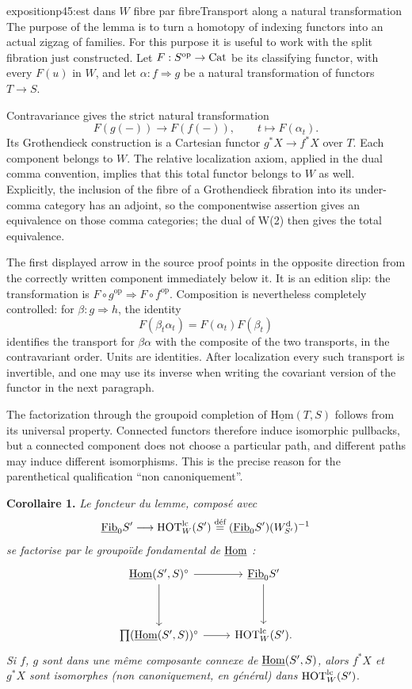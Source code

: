 \begin{dcomment}{exposition}{p45:est dans $W$ fibre par fibre}{Transport along a natural transformation}
The purpose of the lemma is to turn a homotopy of indexing functors into an actual zigzag of families. For this purpose it is useful to work with the split fibration just constructed. Let $F:S^{\mathrm{op}}\to\mathrm{Cat}$ be its classifying functor, with every $F(u)$ in $W$, and let $\alpha:f\Rightarrow g$ be a natural transformation of functors $T\to S$.

Contravariance gives the strict natural transformation
\[
 F(g(-))\longrightarrow F(f(-)),\qquad
 t\longmapsto F(\alpha_t).
\]
Its Grothendieck construction is a Cartesian functor $g^*X\to f^*X$ over $T$. Each component belongs to $W$. The relative localization axiom, applied in the dual comma convention, implies that this total functor belongs to $W$ as well. Explicitly, the inclusion of the fibre of a Grothendieck fibration into its under-comma category has an adjoint, so the componentwise assertion gives an equivalence on those comma categories; the dual of W(2) then gives the total equivalence.

The first displayed arrow in the source proof points in the opposite direction from the correctly written component immediately below it. It is an edition slip: the transformation is $F\circ g^{\mathrm{op}}\Rightarrow F\circ f^{\mathrm{op}}$. Composition is nevertheless completely controlled: for $\beta:g\Rightarrow h$, the identity
\[
 F(\beta_t\alpha_t)=F(\alpha_t)F(\beta_t)
\]
identifies the transport for $\beta\alpha$ with the composite of the two transports, in the contravariant order. Units are identities. After localization every such transport is invertible, and one may use its inverse when writing the covariant version of the functor in the next paragraph.

The factorization through the groupoid completion of $\underline{\mathrm{Hom}}(T,S)$ follows from its universal property. Connected functors therefore induce isomorphic pullbacks, but a connected component does not choose a particular path, and different paths may induce different isomorphisms. This is the precise reason for the parenthetical qualification ``non canoniquement''.
\end{dcomment}


\textbf{Corollaire 1.} \textit{Le foncteur du lemme, composé avec}
\[ \underline{\mathrm{Fib}}_0S'\longrightarrow\mathrm{HOT}^{\mathrm{lc}}_W(S')\overset{\text{déf}}{=}(\underline{\mathrm{Fib}}_0S')(W^{\mathrm{d}}_{S'})^{-1} \]
\textit{se factorise par le groupoïde fondamental de} $\underline{\mathrm{Hom}}$ \textit{:}
\[
\begin{tikzcd}[row sep=huge]
\uHom(S',S)^{\circ} \arrow[r] \arrow[d] & \uFib_0S' \arrow[d] \\
\textstyle\prod(\uHom(S',S))^{\circ} \arrow[r] & \HOT^{\mathrm{lc}}_W(S').
\end{tikzcd}
\]
\textit{Si $f$, $g$ sont dans une même composante connexe de $\underline{\mathrm{Hom}}(S',S)$, alors $f^*X$ et $g^*X$ sont isomorphes (non canoniquement, en général) dans} $\mathrm{HOT}^{\mathrm{lc}}_W(S')$.

